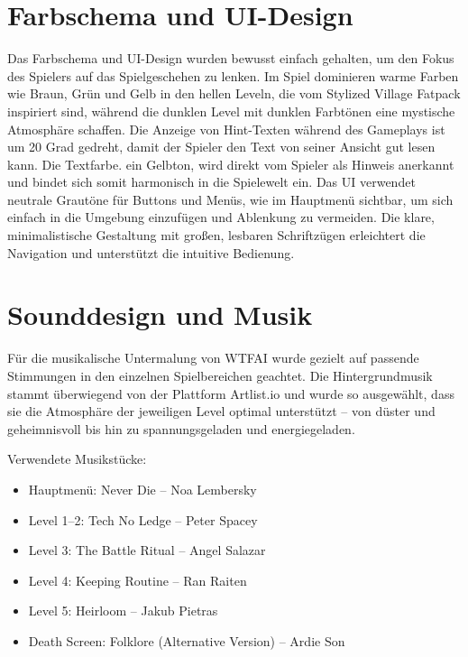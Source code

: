 \documentclass[oneside]{ausarbeitung}
\begin{document}
\section{Farbschema und UI-Design}
\label{sec:farbschemaundui-design}

Das Farbschema und UI-Design wurden bewusst einfach gehalten, um den Fokus des Spielers auf das Spielgeschehen zu lenken. Im Spiel dominieren warme Farben wie Braun, Grün und Gelb in den hellen Leveln, die vom Stylized Village Fatpack inspiriert sind, während die dunklen Level mit dunklen Farbtönen eine mystische Atmosphäre schaffen. Die Anzeige von Hint-Texten während des Gameplays ist um 20 Grad gedreht, damit der Spieler den Text von seiner Ansicht gut lesen kann. Die Textfarbe.  ein Gelbton, wird direkt vom Spieler als Hinweis anerkannt und bindet sich somit harmonisch in die Spielewelt ein. 
Das UI verwendet neutrale Grautöne für Buttons und Menüs, wie im Hauptmenü sichtbar, um sich einfach in die Umgebung einzufügen und Ablenkung zu vermeiden. Die klare, minimalistische Gestaltung mit großen, lesbaren Schriftzügen erleichtert die Navigation und unterstützt die intuitive Bedienung. 


\section{Sounddesign und Musik}
\label{sec:sounddesignundmusik}

Für die musikalische Untermalung von WTFAI wurde gezielt auf passende Stimmungen in den einzelnen Spielbereichen geachtet. Die Hintergrundmusik stammt überwiegend von der Plattform Artlist.io und wurde so ausgewählt, dass sie die Atmosphäre der jeweiligen Level optimal unterstützt – von düster und geheimnisvoll bis hin zu spannungsgeladen und energiegeladen.

Verwendete Musikstücke:

\begin{itemize}
    \item Hauptmenü: Never Die – Noa Lembersky

    \item Level 1–2: Tech No Ledge – Peter Spacey

    \item Level 3: The Battle Ritual – Angel Salazar

    \item Level 4: Keeping Routine – Ran Raiten

    \item Level 5: Heirloom – Jakub Pietras

    \item Death Screen: Folklore (Alternative Version) – Ardie Son
\end{itemize}
\end{document}

